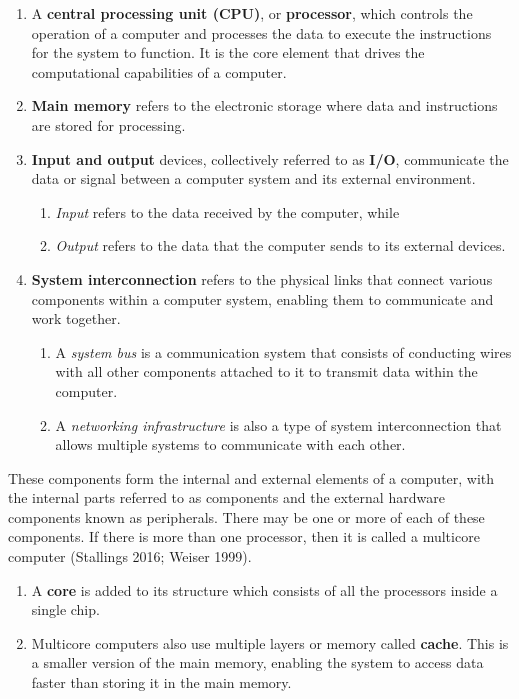 \documentclass[
  letterpaper,
  DIV=11,
  numbers=noendperiod]{scrreprt}
\providecommand{\tightlist}{%
  \setlength{\itemsep}{0pt}\setlength{\parskip}{0pt}}\usepackage{longtable,booktabs,array}
\begin{document}
\begin{enumerate}
\def\labelenumi{\arabic{enumi}.}
\tightlist
\item
  A \textbf{central processing unit (CPU)}, or \textbf{processor}, which
  controls the operation of a computer and processes the data to execute
  the instructions for the system to function. It is the core element
  that drives the computational capabilities of a computer.
\item
  \textbf{Main memory} refers to the electronic storage where data and
  instructions are stored for processing.
\item
  \textbf{Input and output} devices, collectively referred to as
  \textbf{I/O}, communicate the data or signal between a computer system
  and its external environment.

  \begin{enumerate}
  \def\labelenumii{\roman{enumii})}
  \tightlist
  \item
    \emph{Input} refers to the data received by the computer, while
  \item
    \emph{Output} refers to the data that the computer sends to its
    external devices.
  \end{enumerate}
\item
  \textbf{System interconnection} refers to the physical links that
  connect various components within a computer system, enabling them to
  communicate and work together.

  \begin{enumerate}
  \def\labelenumii{\roman{enumii})}
  \tightlist
  \item
    A \emph{system bus} is a communication system that consists of
    conducting wires with all other components attached to it to
    transmit data within the computer.
  \item
    A \emph{networking infrastructure} is also a type of system
    interconnection that allows multiple systems to communicate with
    each other.
  \end{enumerate}
\end{enumerate}

These components form the internal and external elements of a computer,
with the internal parts referred to as components and the external
hardware components known as peripherals. There may be one or more of
each of these components. If there is more than one processor, then it
is called a multicore computer (Stallings 2016; Weiser 1999).

\begin{enumerate}
\def\labelenumi{\arabic{enumi}.}
\setcounter{enumi}{4}
\tightlist
\item
  A \textbf{core} is added to its structure which consists of all the
  processors inside a single chip.
\item
  Multicore computers also use multiple layers or memory called
  \textbf{cache}. This is a smaller version of the main memory, enabling
  the system to access data faster than storing it in the main memory.
\end{enumerate}
\end{document}
